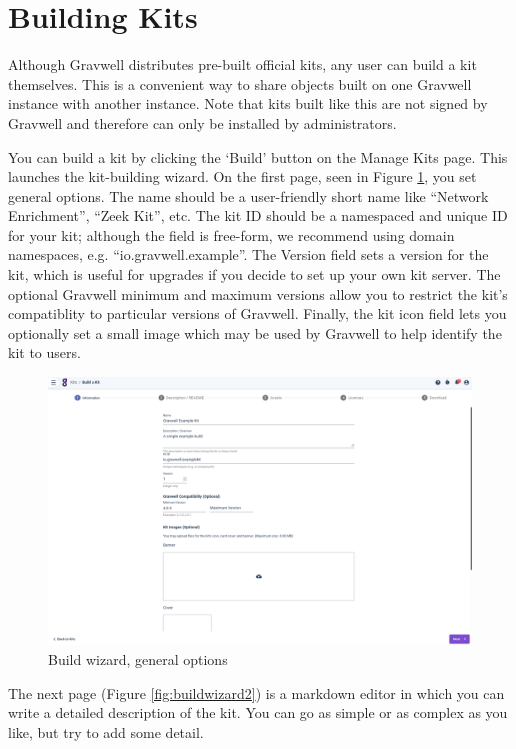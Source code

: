 \section{Building Kits}

Although Gravwell distributes pre-built official kits, any user can build a kit themselves. This is a convenient way to share objects built on one Gravwell instance with another instance. Note that kits built like this are not signed by Gravwell and therefore can only be installed by administrators.

You can build a kit by clicking the `Build' button on the Manage Kits page. This launches the kit-building wizard. On the first page, seen in Figure \ref{fig:buildwizard1}, you set general options. The name should be a user-friendly short name like ``Network Enrichment'', ``Zeek Kit'', etc. The kit ID should be a namespaced and unique ID for your kit; although the field is free-form, we recommend using domain namespaces, e.g. ``io.gravwell.example''. The Version field sets a version for the kit, which is useful for upgrades if you decide to set up your own kit server. The optional Gravwell minimum and maximum versions allow you to restrict the kit's compatiblity to particular versions of Gravwell. Finally, the kit icon field lets you optionally set a small image which may be used by Gravwell to help identify the kit to users.

\begin{figure}[H]
	\includegraphics[width=0.8\linewidth]{images/buildwizard1.png}
	\caption{Build wizard, general options}
	\label{fig:buildwizard1}
\end{figure}

The next page (Figure \ref{fig:buildwizard2}) is a markdown editor in which you can write a detailed description of the kit. You can go as simple or as complex as you like, but try to add some detail. 

